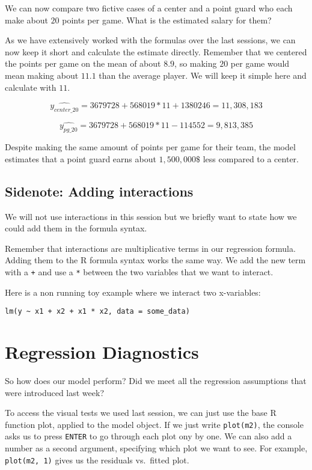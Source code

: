\documentclass[
]{book}
\begin{document}
We can now compare two fictive cases of a center and a point guard who each make
about \(20\) points per game. What is the estimated salary for them?

As we have extensively worked with the formulas over the last sessions, we can
now keep it short and calculate the estimate directly. Remember that we
centered the points per game on the mean of about \(8.9\), so making \(20\) per game
would mean making about \(11.1\) than the average player. We will keep it simple
here and calculate with \(11\).

\[\hat{y_{center\_20}} = 3679728 + 568019 * 11 + 1380246 = 11,308,183\]

\[\hat{y_{pg\_20}} = 3679728 + 568019 * 11 - 114552 = 9,813,385\]

Despite making the same amount of points per game for their team, the model
estimates that a point guard earns about \(1,500,000\$\) less compared to a center.

\hypertarget{sidenote-adding-interactions}{%
\subsection{Sidenote: Adding interactions}\label{sidenote-adding-interactions}}

We will not use interactions in this session but we briefly want to state how we
could add them in the formula syntax.

Remember that interactions are multiplicative terms in our regression formula.
Adding them to the R formula syntax works the same way. We add the new term with
a \texttt{+} and use a \texttt{*} between the two variables that we want to interact.

Here is a non running toy example where we interact two x-variables:

\begin{verbatim}
lm(y ~ x1 + x2 + x1 * x2, data = some_data)
\end{verbatim}

\hypertarget{regression-diagnostics-1}{%
\section{Regression Diagnostics}\label{regression-diagnostics-1}}

So how does our model perform? Did we meet all the regression assumptions that
were introduced last week?

To access the visual tests we used last session, we can just use the base R
function plot, applied to the model object. If we just write \texttt{plot(m2)}, the
console asks us to press \texttt{ENTER} to go through each plot ony by one. We can also
add a number as a second argument, specifying which plot we want to see. For
example, \texttt{plot(m2,\ 1)} gives us the residuals vs.~fitted plot.
\end{document}
